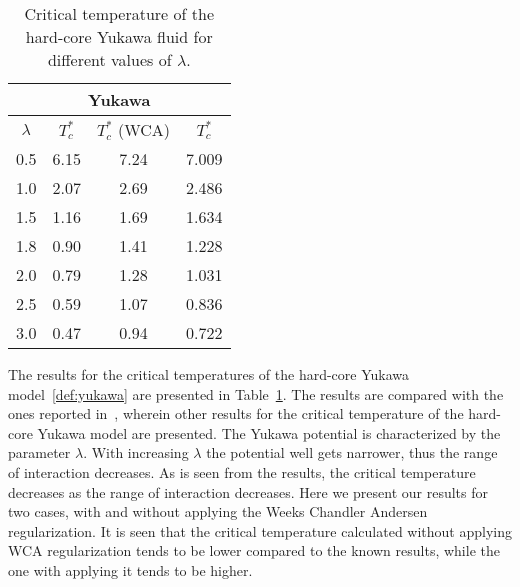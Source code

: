 \begin{table}[h]
	\caption{Critical temperature of the hard-core Yukawa fluid for different values of $\lambda$.}
	\begin{center}
		\begin{tabular}{|c|c|c|c|}
			\hline
			\multicolumn{4}{|c|}{Yukawa}\\
			\hline
			$\lambda$ & $T_c^*$ & $T_c^*$ (WCA)& $T_c^*$ \cite{MendoubWaxJakse2010} \\
			\hline
			0.5 & 6.15 & 7.24 & 7.009 \\
			1.0 & 2.07 & 2.69 & 2.486 \\
			1.5 & 1.16 & 1.69 & 1.634 \\
			1.8 & 0.90 & 1.41 & 1.228 \\
			2.0 & 0.79 & 1.28 & 1.031 \\
			2.5 & 0.59 & 1.07 & 0.836 \\
			3.0 & 0.47 & 0.94 & 0.722 \\
			\hline
		\end{tabular}
	\end{center}
	\label{tab:yukawa_temp_cr}
\end{table}

The results for the critical temperatures of the hard-core Yukawa model~\eqref{def:yukawa} are presented in Table~\ref{tab:yukawa_temp_cr}. The results are compared with the ones reported in~\cite{MendoubWaxJakse2010}, wherein other results for the critical temperature of the hard-core Yukawa model are presented. The Yukawa potential is characterized by the parameter $\lambda$. With increasing $\lambda$ the potential well gets narrower, thus the range of interaction decreases. As is seen from the results, the critical temperature decreases as the range of interaction decreases. Here we present our results for two cases, with and without applying the Weeks Chandler Andersen regularization. It is seen that the critical temperature calculated without applying WCA regularization tends to be lower compared to the known results, while the one with applying it tends to be higher.

